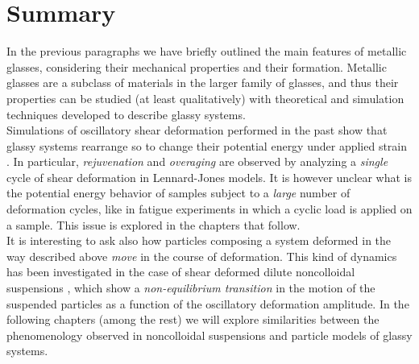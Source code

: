 \section{Summary}

In the previous paragraphs we have briefly outlined the main features of metallic glasses, considering their mechanical properties and their formation. Metallic glasses are a subclass of materials in the larger family of glasses, and thus their properties can be studied (at least qualitatively) with theoretical and simulation techniques developed to describe glassy systems. \\
Simulations of oscillatory shear deformation performed in the past show that glassy systems rearrange so to change their potential energy under applied strain \cite{lacks2004energy, utz2000atomistic}. In particular, \emph{rejuvenation} and \emph{overaging} are observed by analyzing a \emph{single} cycle of shear deformation in Lennard-Jones models.
It is however unclear what is the potential energy behavior of samples subject to a \emph{large} number of deformation cycles, like in fatigue experiments in which a cyclic load is applied on a sample. This issue is explored in the chapters that follow.\\
It is interesting to ask also how particles composing a system deformed in the way described above \emph{move} in the course of deformation. This kind of dynamics has been investigated in the case of shear deformed dilute noncolloidal suspensions \cite{corte2008random}, which show a \emph{non-equilibrium transition} in the motion of the suspended particles as a function of the oscillatory deformation amplitude. In the following chapters (among the rest) we will explore similarities between the phenomenology observed in noncolloidal suspensions and particle models of glassy systems.
